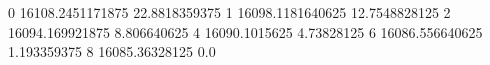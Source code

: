 0 16108.2451171875 22.8818359375
1 16098.1181640625 12.7548828125
2 16094.169921875 8.806640625
4 16090.1015625 4.73828125
6 16086.556640625 1.193359375
8 16085.36328125 0.0
